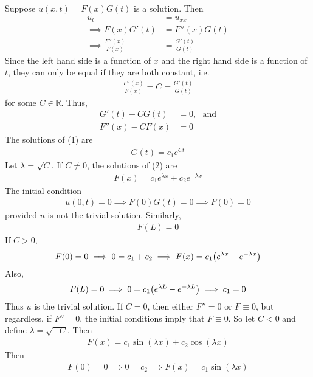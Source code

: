 \documentclass[12pt]{article}
\theoremstyle{plain}
\begin{document}
Suppose $u(x,t) = F(x)G(t)$ is a solution.  Then
\begin{align*}
    u_t &= u_{xx} \\
    \implies F(x)G'(t) &= F''(x)G(t) \\
    \implies \frac{F''(x)}{F(x)} &= \frac{G'(t)}{G(t)}
\end{align*}
Since the left hand side is a function of $x$ and the right hand side is a function of $t$, they can only be equal if they are both constant, i.e.
\begin{align*}
    \frac{F''(x)}{F(x)} = C = \frac{G'(t)}{G(t)}
\end{align*}
for some $C \in \mathbb{R}$.  Thus,
\begin{align}
    G'(t) - C G(t) &= 0,\ \ \ \text{and} \\
    F''(x) - C F(x) &= 0
\end{align}
The solutions of (1) are
\begin{align*}
    G(t) = c_1 e^{Ct}
\end{align*}
Let $\lambda = \sqrt{C}$.  If $C \neq 0$, the solutions of (2) are
\begin{align*}
    F(x) = c_1 e^{\lambda x} + c_2 e^{-\lambda x}
\end{align*}
The initial condition
\begin{align*}
    u(0,t) = 0 \implies F(0)G(t) = 0 \implies F(0) = 0
\end{align*}
provided $u$ is not the trivial solution.  Similarly,
\begin{align*}
    F(L) = 0
\end{align*}
If $C > 0$,
\begin{align*}
    F(0) = 0 \implies 0 = c_1 + c_2 \implies F(x) = c_1\qty(e^{\lambda x} - e^{-\lambda x})
\end{align*}
Also,
\begin{align*}
    F(L) = 0 \implies 0 = c_1\qty(e^{\lambda L} - e^{-\lambda L}) \implies c_1 = 0
\end{align*}
Thus $u$ is the trivial solution.  If $C = 0$, then either $F'' = 0$ or $F \equiv 0$, but regardless, if $F'' = 0$, the initial conditions imply that $F \equiv 0$.  So let $C < 0$ and define $\lambda = \sqrt{-C}$.  Then
\begin{align*}
    F(x) = c_1 \sin(\lambda x) + c_2 \cos(\lambda x)
\end{align*}
Then
\begin{align*}
    F(0) = 0 \implies 0 = c_2 \implies F(x) = c_1 \sin(\lambda x)
\end{align*}
\end{document}
